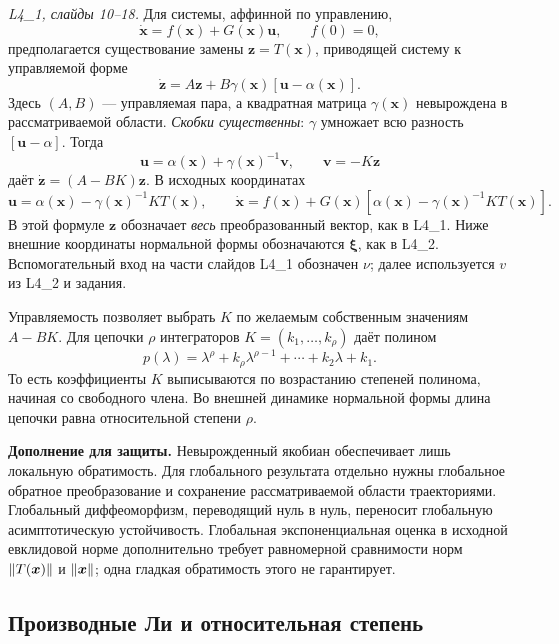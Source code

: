 \textit{L4\_1, слайды 10--18.}
Для системы, аффинной по управлению,
\[
 \dot{\bm x}=f(\bm x)+G(\bm x)\bm u,
 \qquad f(0)=0,
\]
предполагается существование замены $\bm z=T(\bm x)$, приводящей
систему к управляемой форме
\[
 \dot{\bm z}=A\bm z+B\gamma(\bm x)[\bm u-\alpha(\bm x)].
\]
Здесь $(A,B)$ --- управляемая пара, а квадратная матрица
$\gamma(\bm x)$ невырождена в рассматриваемой области.
\emph{Скобки существенны}: $\gamma$ умножает всю разность
$[\bm u-\alpha]$. Тогда
\[
 \bm u=\alpha(\bm x)+\gamma(\bm x)^{-1}\bm v,
 \qquad \bm v=-K\bm z
\]
даёт $\dot{\bm z}=(A-BK)\bm z$. В исходных координатах
\[
 \boxed{\bm u=\alpha(\bm x)-\gamma(\bm x)^{-1}KT(\bm x)},
 \qquad
 \dot{\bm x}=f(\bm x)+G(\bm x)
 [\alpha(\bm x)-\gamma(\bm x)^{-1}KT(\bm x)].
\]
В этой формуле $\bm z$ обозначает \emph{весь} преобразованный вектор,
как в L4\_1. Ниже внешние координаты нормальной формы обозначаются
$\bm\xi$, как в L4\_2. Вспомогательный вход на части слайдов L4\_1
обозначен $\nu$; далее используется $v$ из L4\_2 и задания.

Управляемость позволяет выбрать $K$ по желаемым собственным значениям
$A-BK$. Для цепочки $\rho$ интеграторов
$K=(k_1,\ldots,k_\rho)$ даёт полином
\[
 p(\lambda)=\lambda^\rho+k_\rho\lambda^{\rho-1}+\cdots+k_2\lambda+k_1.
\]
То есть коэффициенты $K$ выписываются по возрастанию степеней
полинома, начиная со свободного члена. Во внешней динамике нормальной
формы длина цепочки равна относительной степени $\rho$.

\textbf{Дополнение для защиты.} Невырожденный якобиан обеспечивает
лишь локальную обратимость. Для глобального результата отдельно
нужны глобальное обратное преобразование и сохранение рассматриваемой
области траекториями. Глобальный диффеоморфизм, переводящий нуль в нуль,
переносит глобальную асимптотическую устойчивость. Глобальная
экспоненциальная оценка в исходной евклидовой норме дополнительно
требует равномерной сравнимости норм $\left\lVert T(\bm x)\right\rVert$ и
$\left\lVert\bm x\right\rVert$; одна гладкая обратимость этого не гарантирует.

\subsection{Производные Ли и относительная степень}

